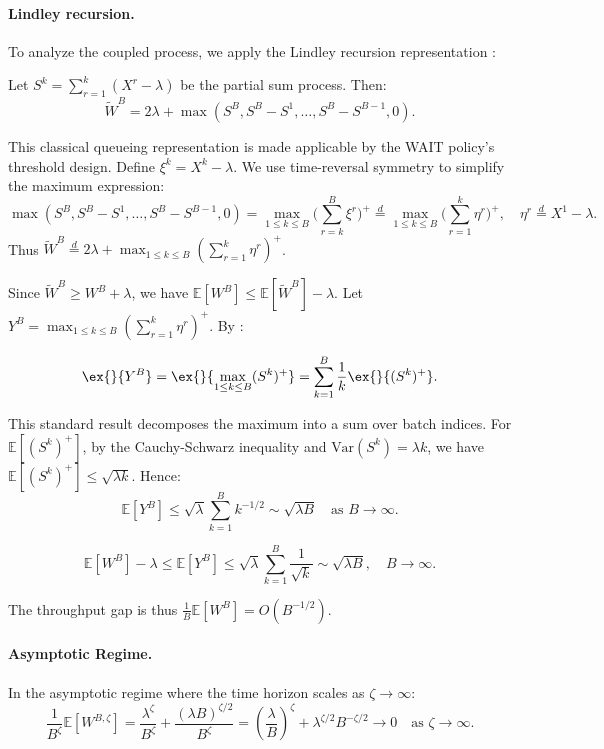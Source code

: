 \paragraph{Lindley recursion.} To analyze the coupled process, we apply the Lindley recursion representation \citep[Proposition 6.3]{asmussen2003applied}:
\begin{lemma}\label{lem:lindley_rep}
Let $S^k=\sum_{r=1}^k (X^r-\lambda)$ be the partial sum process. Then:
$$\tilde{W}^B=2\lambda+\max(S^B, S^B-S^1,\ldots,S^B-S^{B-1},0).$$
\end{lemma}
\noindent This classical queueing representation is made applicable by the WAIT policy's threshold design. Define $\xi^k = X^k-\lambda$. We use time-reversal symmetry to simplify the maximum expression:
$$\max(S^B, S^B-S^1,\ldots,S^B-S^{B-1},0)=\max_{1\leq k\leq B}\Big(\sum_{r=k}^{B}\xi^r\Big)^+\overset{d}{=}\max_{1\leq k\leq B}\Big(\sum_{r=1}^{k}\eta^r\Big)^+, \quad \eta^r\overset{d}{=}X^1-\lambda.$$
Thus $\tilde{W}^B \overset{d}{=}2\lambda+\max_{1\leq k\leq B}(\sum_{r=1}^{k}\eta^r)^+$.

Since $\tilde{W}^B \geq W^B + \lambda$, we have $\mathbb{E}[W^B]\leq \mathbb{E}[\tilde{W}^B]-\lambda$. Let $Y^B = \max_{1\leq k\leq B}(\sum_{r=1}^{k}\eta^r)^+$. By \cite[Lemma 2]{strait1974maximum}:
\begin{lemma}\label{lem:Y_T}
$$\ex{}{Y^B}=\ex{}{\max_{1\leq k\leq B}(S^k)^+}=\sum_{k=1}^B \frac{1}{k}\ex{}{(S^k)^+}.$$
\end{lemma}
\noindent This standard result \citep{strait1974maximum} decomposes the maximum into a sum over batch indices. For $\mathbb{E}[(S^k)^+]$, by the Cauchy-Schwarz inequality and $\text{Var}(S^k) = \lambda k$, we have $\mathbb{E}[(S^k)^+] \leq \sqrt{\lambda k}$. Hence:
$$\mathbb{E}[Y^B] \leq \sqrt{\lambda} \sum_{k=1}^B k^{-1/2} \sim \sqrt{\lambda B} \quad \text{as } B \to \infty.$$

\begin{lemma}\label{lemma::throughput gap}
$$\mathbb{E}[W^B]-\lambda\leq \mathbb{E}[Y^B]\leq  \sqrt{\lambda} \sum_{k=1}^B \frac{1}{\sqrt{k}} \sim\sqrt{\lambda B},\quad B\to \infty.$$
\end{lemma}
\noindent The throughput gap is thus $\frac{1}{B}\mathbb{E}[W^B] = O(B^{-1/2})$.

\paragraph{Asymptotic Regime.} In the asymptotic regime where the time horizon scales as $\zeta \to \infty$:
$$\frac{1}{B^{\zeta}}\mathbb{E}[W^{B,\zeta}]= \frac{\lambda^{\zeta}}{B^{\zeta}} + \frac{(\lambda B)^{\zeta/2}}{B^{\zeta}} = \left(\frac{\lambda}{B}\right)^{\!\zeta} + \lambda^{\zeta/2} B^{-\zeta/2} \to 0 \quad \text{as } \zeta \to \infty.$$

